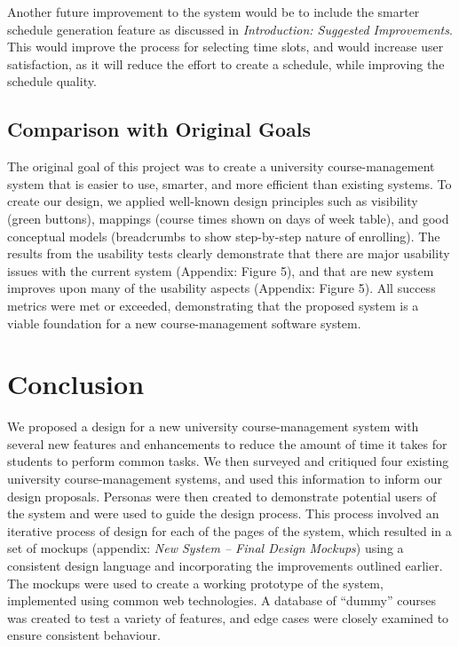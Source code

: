 \documentclass[10pt]{article}
\begin{document}
\begin{multicols}{2}
Another future improvement to the system would be to include the smarter schedule generation feature as discussed in \emph{Introduction: Suggested Improvements}. This would improve the process for selecting time slots, and would increase user satisfaction, as it will reduce the effort to create a schedule, while improving the schedule quality.

\subsection*{Comparison with Original Goals}
The original goal of this project was to create a university course-management system that is easier to use, smarter, and more efficient than existing systems. To create our design, we applied well-known design principles such as visibility (green buttons), mappings (course times shown on days of week table), and good conceptual models (breadcrumbs to show step-by-step nature of enrolling). The results from the usability tests clearly demonstrate that there are major usability issues with the current system (Appendix: Figure 5), and that are new system improves upon many of the usability aspects (Appendix: Figure 5). All success metrics were met or exceeded, demonstrating that the proposed system is a viable foundation for a new course-management software system.

\section*{Conclusion}
We proposed a design for a new university course-management system with several new features and enhancements to reduce the amount of time it takes for students to perform common tasks. We then surveyed and critiqued four existing university course-management systems, and used this information to inform our design proposals. Personas were then created to demonstrate potential users of the system and were used to guide the design process. This process involved an iterative process of design for each of the pages of the system, which resulted in a set of mockups (appendix: \emph{New System -- Final Design Mockups}) using a consistent design language and incorporating the improvements outlined earlier.\\

The mockups were used to create a working prototype of the system, implemented using common web technologies. A database of ``dummy'' courses was created to test a variety of features, and edge cases were closely examined to ensure consistent behaviour.\\


\end{multicols}
\end{document}
